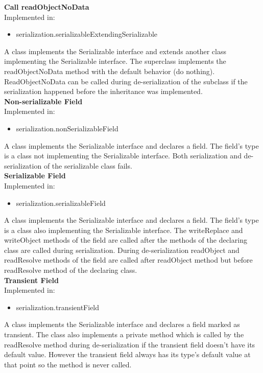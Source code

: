 \documentclass{article}
\begin{document}
\noindent
\textbf{Call readObjectNoData}\\
Implemented in: 
\begin{itemize}
    \item serialization.serializableExtendingSerializable
\end{itemize}
A class implements the Serializable interface and extends another class implementing the Serializable interface. The superclass implements the readObjectNoData method with the default behavior (do nothing). ReadObjectNoData can be called during de-serialization of the subclass if the serialization happened before the inheritance was implemented.\\

\noindent
\textbf{Non-serializable Field}\\
Implemented in: 
\begin{itemize}
    \item serialization.nonSerializableField
\end{itemize}
A class implements the Serializable interface and declares a field. The field's type is a class not implementing the Serializable interface. Both serialization and de-serialization of the serializable class fails.\\

\noindent
\textbf{Serializable Field}\\
Implemented in: 
\begin{itemize}
    \item serialization.serializableField
\end{itemize}
A class implements the Serializable interface and declares a field. The field's type is a class also implementing the Serializable interface. The writeReplace and writeObject methods of the field are called after the methods of the declaring class are called during serialization. During de-serialization readObject and readResolve methods of the field are called after readObject method but before readResolve method of the declaring class.\\

\noindent
\textbf{Transient Field}\\
Implemented in: 
\begin{itemize}
    \item serialization.transientField
\end{itemize}
A class implements the Serializable interface and declares a field marked as transient. The class also implements a private method which is called by the readResolve method during de-serialization if the transient field doesn't have its default value. However the transient field always has its type's default value at that point so the method is never called.\\
\end{document}
